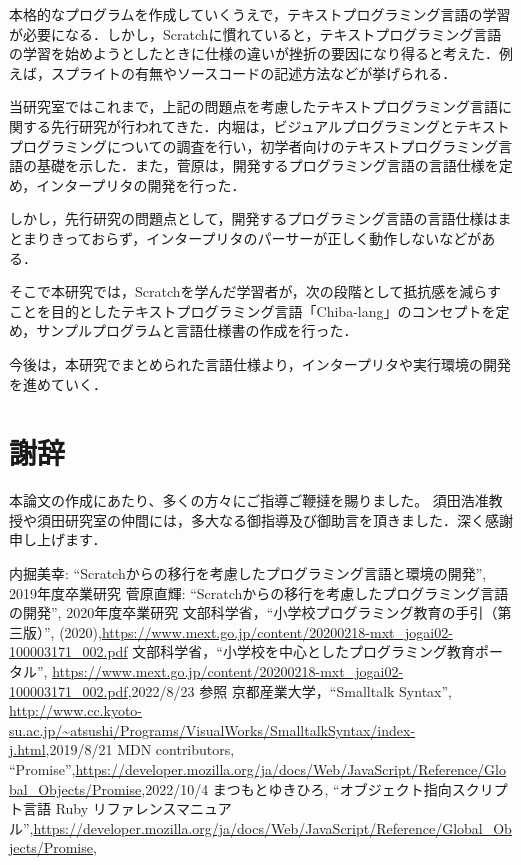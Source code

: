 \documentclass[10pt,a4j]{ltjsarticle}
\begin{document}
本格的なプログラムを作成していくうえで，テキストプログラミング言語の学習が必要になる．しかし，Scratchに慣れていると，テキストプログラミング言語の学習を始めようとしたときに仕様の違いが挫折の要因になり得ると考えた．例えば，スプライトの有無やソースコードの記述方法などが挙げられる．

当研究室ではこれまで，上記の問題点を考慮したテキストプログラミング言語に関する先行研究が行われてきた．内堀は，ビジュアルプログラミングとテキストプログラミングについての調査を行い，初学者向けのテキストプログラミング言語の基礎を示した\cite{senkou1}．また，菅原は，開発するプログラミング言語の言語仕様を定め，インタープリタの開発を行った\cite{senkou2}．

しかし，先行研究の問題点として，開発するプログラミング言語の言語仕様はまとまりきっておらず，インタープリタのパーサーが正しく動作しないなどがある．

そこで本研究では，Scratchを学んだ学習者が，次の段階として抵抗感を減らすことを目的としたテキストプログラミング言語「Chiba-lang」のコンセプトを定め，サンプルプログラムと言語仕様書の作成を行った．

今後は，本研究でまとめられた言語仕様より，インタープリタや実行環境の開発を進めていく．
\clearpage

\section{謝辞}
本論文の作成にあたり、多くの方々にご指導ご鞭撻を賜りました。
須田浩准教授や須田研究室の仲間には，多大なる御指導及び御助言を頂きました．深く感謝申し上げます．
\clearpage

\begin{thebibliography}{99}
 内掘美幸: ``Scratchからの移行を考慮したプログラミング言語と環境の開発'', 2019年度卒業研究
 菅原直輝: ``Scratchからの移行を考慮したプログラミング言語の開発'', 2020年度卒業研究
 文部科学省，``小学校プログラミング教育の手引（第三版）'', (2020),\url{https://www.mext.go.jp/content/20200218-mxt_jogai02-100003171_002.pdf}
 文部科学省，``小学校を中心としたプログラミング教育ポータル'', \url{https://www.mext.go.jp/content/20200218-mxt_jogai02-100003171_002.pdf},2022/8/23 参照
 京都産業大学，``Smalltalk Syntax'', \url{http://www.cc.kyoto-su.ac.jp/~atsushi/Programs/VisualWorks/SmalltalkSyntax/index-j.html},2019/8/21
 MDN contributors, ``Promise'',\url{https://developer.mozilla.org/ja/docs/Web/JavaScript/Reference/Global_Objects/Promise},2022/10/4
 まつもとゆきひろ, ``オブジェクト指向スクリプト言語 Ruby リファレンスマニュアル'',\url{https://developer.mozilla.org/ja/docs/Web/JavaScript/Reference/Global_Objects/Promise},

\end{thebibliography}
\end{document}
